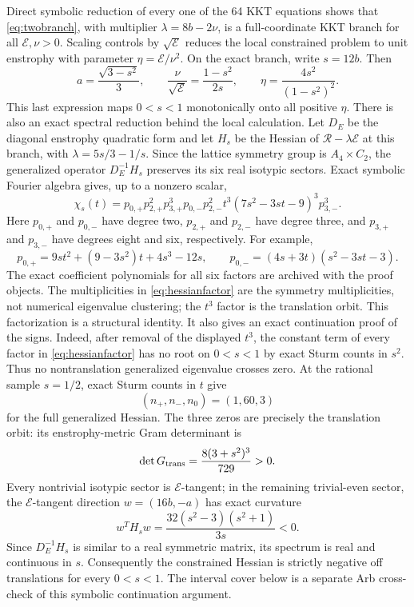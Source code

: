 \documentclass[11pt]{article}
\newcommand{\E}{\mathcal{E}}
\newcommand{\rate}{\mathcal{R}}
\begin{document}
Direct symbolic reduction of every one of the 64 KKT equations shows that
\eqref{eq:twobranch}, with multiplier $\lambda=8b-2\nu$, is a full-coordinate
KKT branch for all $\E,\nu>0$.  Scaling controls by $\sqrt{\E}$ reduces the
local constrained problem to unit enstrophy with parameter
$\eta=\E/\nu^2$.  On the exact branch, write $s=12b$. Then
\[
a=\frac{\sqrt{3-s^2}}{3},\qquad
\frac{\nu}{\sqrt{\E}}=\frac{1-s^2}{2s},\qquad
\eta=\frac{4s^2}{(1-s^2)^2}.
\]
This last expression maps $0<s<1$ monotonically onto all positive $\eta$.
There is also an exact spectral reduction behind the local calculation.  Let
$D_E$ be the diagonal enstrophy quadratic form and let $H_s$ be the Hessian
of $\rate-\lambda\E$ at this branch, with
$\lambda=5s/3-1/s$.  Since the lattice symmetry group is $A_4\times C_2$,
the generalized operator $D_E^{-1}H_s$ preserves its six real isotypic
sectors.  Exact symbolic Fourier algebra gives, up to a nonzero scalar,
\begin{equation}\label{eq:hessianfactor}
 \chi_s(t)=p_{0,+}p_{2,+}^2p_{3,+}^3
 p_{0,-}p_{2,-}^2t^3(7s^2-3st-9)^3p_{3,-}^3.
\end{equation}
Here $p_{0,+}$ and $p_{0,-}$ have degree two, $p_{2,+}$ and $p_{2,-}$ have
degree three, and $p_{3,+}$ and $p_{3,-}$ have degrees eight and six,
respectively.  For example,
\[
 p_{0,+}=9st^2+(9-3s^2)t+4s^3-12s,
 \qquad
 p_{0,-}=(4s+3t)(s^2-3st-3).
\]
The exact coefficient polynomials for all six factors are archived with the
proof objects.  The multiplicities in \eqref{eq:hessianfactor} are the
symmetry multiplicities, not numerical eigenvalue clustering; the $t^3$
factor is the translation orbit.  This factorization is a structural
identity.  It also gives an exact continuation proof of the signs.  Indeed,
after removal of the displayed $t^3$, the constant term of every factor in
\eqref{eq:hessianfactor} has no root on $0<s<1$ by exact Sturm counts in
$s^2$.  Thus no nontranslation generalized eigenvalue crosses zero.  At the
rational sample $s=1/2$, exact Sturm counts in $t$ give
\[
 (n_+,n_-,n_0)=(1,60,3)
\]
for the full generalized Hessian.  The three zeros are precisely the
translation orbit: its enstrophy-metric Gram determinant is
\[
 \det G_{\rm trans}=\frac{8(3+s^2)^3}{729}>0.
\]
Every nontrivial isotypic sector is $\E$-tangent; in the
remaining trivial-even sector, the $\E$-tangent direction
$w=(16b,-a)$ has exact curvature
\[
 w^T H_s w=\frac{32(s^2-3)(s^2+1)}{3s}<0.
\]
Since $D_E^{-1}H_s$ is similar to a real symmetric matrix, its spectrum is
real and continuous in $s$.  Consequently the constrained Hessian is strictly
negative off translations for every $0<s<1$.  The interval cover below is a
separate Arb cross-check of this symbolic continuation argument.
\end{document}
